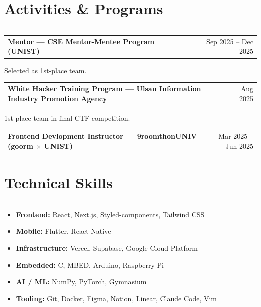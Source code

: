 \documentclass[11pt,letterpaper]{article}
\makeatletter
\newcommand{\cvrow}[2]{%
  \noindent\begin{tabularx}{\linewidth}{@{}X r@{}}\textbf{#1} & {#2}\end{tabularx}\par
}
\newcommand{\cvsub}[1]{\noindent #1\par}
\makeatother
\begin{document}
\section*{Activities \& Programs}
\vspace{-4pt}
\rule{\textwidth}{0.5pt}\vspace{2pt}

\cvrow{Mentor --- CSE Mentor-Mentee Program (UNIST)}{Sep 2025 -- Dec 2025}
\cvsub{Selected as 1st-place team.}
\vspace{4pt}

\cvrow{White Hacker Training Program --- Ulsan Information Industry Promotion Agency}{Aug 2025}
\cvsub{1st-place team in final CTF competition.}
\vspace{4pt}

\cvrow{Frontend Devlopment Instructor --- 9roomthonUNIV (goorm $\times$ UNIST)}{Mar 2025 -- Jun 2025}

\vspace{4pt}
\section*{Technical Skills}
\vspace{-4pt}
\rule{\textwidth}{0.5pt}\vspace{2pt}

\begin{itemize}[leftmargin=0pt,label={}]
  \item \textbf{Frontend:} React, Next.js, Styled-components, Tailwind CSS
  \item \textbf{Mobile:} Flutter, React Native
  \item \textbf{Infrastructure:} Vercel, Supabase, Google Cloud Platform
  \item \textbf{Embedded:} C, MBED, Arduino, Raspberry Pi
  \item \textbf{AI / ML:} NumPy, PyTorch, Gymnasium
  \item \textbf{Tooling:} Git, Docker, Figma, Notion, Linear, Claude Code, Vim
\end{itemize}
\end{document}
